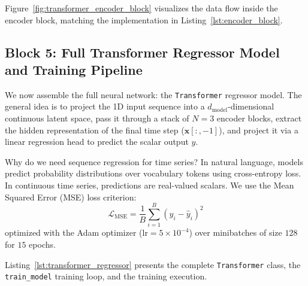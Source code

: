 \documentclass[11pt,a4paper]{article}
\begin{document}
Figure~\ref{fig:transformer_encoder_block} visualizes the data flow inside the encoder block, matching the implementation in Listing~\ref{lst:encoder_block}.

\subsection{Block 5: Full Transformer Regressor Model and Training Pipeline}

We now assemble the full neural network: the \texttt{Transformer} regressor model. The general idea is to project the 1D input sequence into a $d_{\text{model}}$-dimensional continuous latent space, pass it through a stack of $N = 3$ encoder blocks, extract the hidden representation of the final time step ($\mathbf{x}[:, -1]$), and project it via a linear regression head to predict the scalar output $y$.

Why do we need sequence regression for time series? In natural language, models predict probability distributions over vocabulary tokens using cross-entropy loss. In continuous time series, predictions are real-valued scalars. We use the Mean Squared Error (MSE) loss criterion:
\begin{equation}
\mathcal{L}_{\text{MSE}} = \frac{1}{B} \sum_{i=1}^B (y_i - \hat{y}_i)^2
\end{equation}
optimized with the Adam optimizer ($\text{lr} = 5 \times 10^{-4}$) over minibatches of size $128$ for $15$ epochs.

Listing~\ref{lst:transformer_regressor} presents the complete \texttt{Transformer} class, the \texttt{train\_model} training loop, and the training execution.
\end{document}
